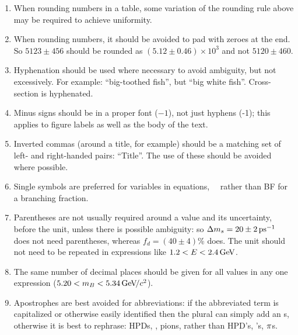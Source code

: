 \begin{enumerate}
\item When rounding numbers in a table, some variation of the rounding
  rule above may be required to achieve uniformity.

\item When rounding numbers, it should be avoided to pad with zeroes
  at the end. So $5123 \pm 456$ should be rounded as $(5.12 \pm 0.46)
  \times 10^3$ and not $5120 \pm 460$.

\item Hyphenation should be used where necessary to avoid ambiguity,
  but not excessively. For example: ``big-toothed fish'', but ``big
  white fish''.  Cross-section is hyphenated.

\item Minus signs should be in a proper font ($-1$), not just hyphens
  (-1); this applies to figure labels as well as the body of the text.

\item Inverted commas (around a title, for example) should be a
  matching set of left- and right-handed pairs: ``Title''. The use of
  these should be avoided where possible.

\item Single symbols are preferred for variables in equations, \eg\
  \BF\ rather than BF for a branching fraction.

\item Parentheses are not usually required around a value and its
  uncertainty, before the unit, unless there is possible ambiguity: so
  $\Delta m_{s} = 20 \pm 2{\rm \,ps^{-1}}$ does not need parentheses, whereas $f_d =
  (40 \pm 4)$\% does.  The unit should not need to be repeated in
  expressions like $1.2 < E < 2.4\mathrm{\,Ge\kern -0.1em V}$.

\item The same number of decimal places should be given for all values
  in any one expression (\eg $5.20 < m_B < 5.34{\mathrm{\,Ge\kern -0.1em V\!/}c^2}$).

\item Apostrophes are best avoided for abbreviations: if the abbreviated term
  is capitalized or otherwise easily identified then the plural can simply add
  an s, otherwise it is best to rephrase: \eg HPDs, \pizs, pions, rather
  than HPD's, \piz's, $\pi$s.

\end{enumerate}
